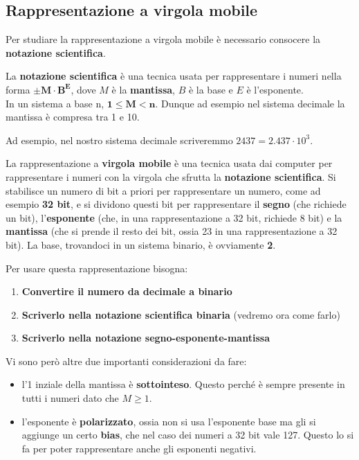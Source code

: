 \documentclass[11pt, a4paper, titlepage, oneside]{scrbook}
\begin{document}
\subsection{Rappresentazione a virgola mobile}

Per studiare la rappresentazione a virgola mobile è necessario consocere la \textbf{notazione scientifica}.

\begin{Definizione}
\label{def-notazione-scientifica}
La \textbf{notazione scientifica} è una tecnica usata per rappresentare i numeri nella forma $\bm{\pm M \cdot B^E}$, dove $M$ è la \textbf{mantissa}, $B$ è la base e $E$ è l'esponente. \\
\NB In un sistema a base n, $\bm{1 \leq M < n}$. Dunque ad esempio nel sistema decimale la mantissa è compresa tra 1 e 10.
\end{Definizione}

Ad esempio, nel nostro sistema decimale scriveremmo $2437 = 2.437 \cdot 10^3$. 

\begin{Proprieta}
\label{prop-rappresentazione-virgola-mobile}
La rappresentazione a \textbf{virgola mobile} è una tecnica usata dai computer per rappresentare i numeri con la virgola che sfrutta la \textbf{notazione scientifica}. Si stabilisce un numero di bit a priori per rappresentare un numero, come ad esempio \textbf{32 bit}, e si dividono questi bit per rappresentare il \textbf{segno} (che richiede un bit), l'\textbf{esponente} (che, in una rappresentazione a 32 bit, richiede 8 bit) e la \textbf{mantissa} (che si prende il resto dei bit, ossia 23 in una rappresentazione a 32 bit). La base, trovandoci in un sistema binario, è ovviamente \textbf{2}.
\end{Proprieta}

Per usare questa rappresentazione bisogna:
\begin{enumerate}[label=\arabic*°]
    \item \textbf{Convertire il numero da decimale a binario}
    \item \textbf{Scriverlo nella notazione scientifica binaria} (vedremo ora come farlo)
    \item \textbf{Scriverlo nella notazione segno-esponente-mantissa}
\end{enumerate}

Vi sono però altre due importanti considerazioni da fare:
\begin{itemize}
    \item l'1 inziale della mantissa è \textbf{sottointeso}. Questo perché è sempre presente in tutti i numeri dato che $M \geq 1$.
    \item l'esponente è \textbf{polarizzato}, ossia non si usa l'esponente base ma gli si aggiunge un certo \textbf{bias}, che nel caso dei numeri a 32 bit vale 127. Questo lo si fa per poter rappresentare anche gli esponenti negativi.
\end{itemize}
\end{document}

